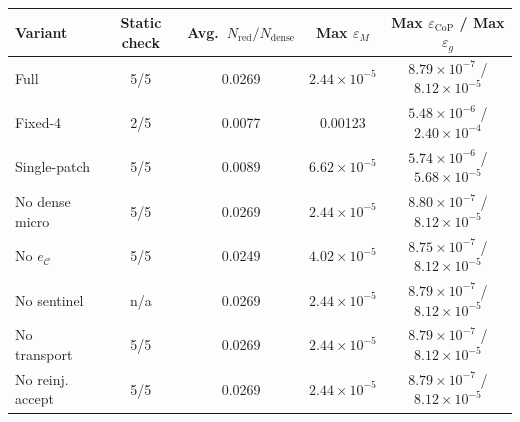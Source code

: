 \begin{tabular}{@{}lcccc@{}}
\toprule
Variant & Static check & Avg.\ $N_{\mathrm{red}}/N_{\mathrm{dense}}$ & Max $\varepsilon_M$ & Max $\varepsilon_{\mathrm{CoP}}$ / Max $\varepsilon_g$ \\
\midrule
Full & 5/5 & 0.0269 & $2.44\times 10^{-5}$ & $8.79\times 10^{-7}$ / $8.12\times 10^{-5}$ \\
Fixed-4 & 2/5 & 0.0077 & 0.00123 & $5.48\times 10^{-6}$ / $2.40\times 10^{-4}$ \\
Single-patch & 5/5 & 0.0089 & $6.62\times 10^{-5}$ & $5.74\times 10^{-6}$ / $5.68\times 10^{-5}$ \\
No dense micro & 5/5 & 0.0269 & $2.44\times 10^{-5}$ & $8.80\times 10^{-7}$ / $8.12\times 10^{-5}$ \\
No $e_{\mathcal{C}}$ & 5/5 & 0.0249 & $4.02\times 10^{-5}$ & $8.75\times 10^{-7}$ / $8.12\times 10^{-5}$ \\
No sentinel & n/a & 0.0269 & $2.44\times 10^{-5}$ & $8.79\times 10^{-7}$ / $8.12\times 10^{-5}$ \\
No transport & 5/5 & 0.0269 & $2.44\times 10^{-5}$ & $8.79\times 10^{-7}$ / $8.12\times 10^{-5}$ \\
No reinj. accept & 5/5 & 0.0269 & $2.44\times 10^{-5}$ & $8.79\times 10^{-7}$ / $8.12\times 10^{-5}$ \\
\bottomrule
\end{tabular}
